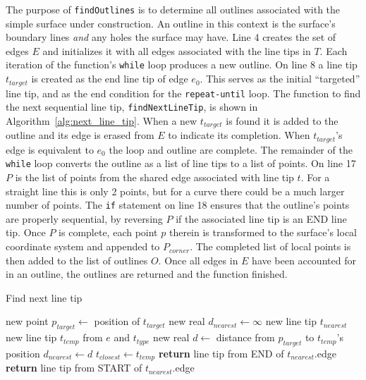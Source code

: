 The purpose of \verb|findOutlines| is to determine all outlines associated with the simple surface under construction.
An outline in this context is the surface's boundary lines \textit{and} any holes the surface may have.
Line 4 creates the set of edges $E$ and initializes it with all edges associated with the line tips in $T$.
Each iteration of the function's \verb|while| loop produces a new outline.
On line 8 a line tip $t_{target}$ is created as the end line tip of edge $e_0$.
This serves as the initial ``targeted'' line tip, and as the end condition for the \verb|repeat-until| loop.
The function to find the next sequential line tip, \verb|findNextLineTip|, is shown in Algorithm~\ref{alg:next_line_tip}.
When a new $t_{target}$ is found it is added to the outline and its edge is erased from $E$ to indicate its completion.
When $t_{target}$'s edge is equivalent to $e_0$ the loop and outline are complete.
The remainder of the \verb|while| loop converts the outline as a list of line tips to a list of points.
On line 17 $P$ is the list of points from the shared edge associated with line tip $t$.
For a straight line this is only 2 points, but for a curve there could be a much larger number of points.
The \verb|if| statement on line 18 ensures that the outline's points are properly sequential, by reversing $P$ if the associated line tip is an END line tip.
Once $P$ is complete, each point $p$ therein is transformed to the surface's local coordinate system and appended to $P_{corner}$.
The completed list of local points is then added to the list of outlines $O$.
Once all edges in $E$ have been accounted for in an outline, the outlines are returned and the function finished.

\begin{algorithm}[htb]
	\caption{Find next line tip}\label{alg:next_line_tip}
\begin{algorithmic}[1]
	\State new point $p_{target} \leftarrow$ position of $t_{target}$
	\State new real $d_{nearest} \leftarrow \infty$
	\State new line tip $t_{nearest}$
			\State new line tip $t_{temp}$ from $e$ and $t_{type}$
			\State new real $d \leftarrow$ distance from $p_{target}$ to $t_{temp}$'s position
				\State $d_{nearest} \leftarrow d$
				\State $t_{closest} \leftarrow t_{temp}$
			\EndIf
		\EndFor
	\EndFor
		\State \textbf{return} line tip from END of $t_{nearest}$.edge
	\Else
		\State \textbf{return} line tip from START of $t_{nearest}$.edge
	\EndIf
\EndFunction
\end{algorithmic}
\end{algorithm}

